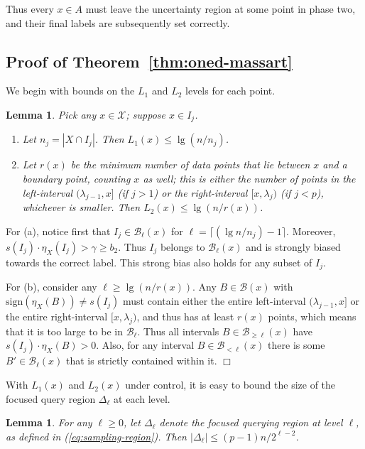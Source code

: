 \documentclass{article}
\def\X{{\mathcal X}}
\def\B{{\mathcal B}}
\newtheorem{lemma}[thm]{Lemma}
\newenvironment{proof}{\noindent {\sc Proof:}}{$\Box$ \medskip}
\begin{document}
Thus every $x \in A$ must leave the uncertainty region at some point in phase two, and their final labels are subsequently set correctly.

\subsection{Proof of Theorem~\ref{thm:oned-massart}}

We begin with bounds on the $L_1$ and $L_2$ levels for each point.
\begin{lemma}
Pick any $x \in \X$; suppose $x \in I_j$.
\begin{enumerate}
\item[(a)] Let $n_j = |X \cap I_j|$. Then $L_1(x) \leq \lg (n/n_j)$.
\item[(b)] Let $r(x)$ be the minimum number of data points that lie between $x$ and a boundary point, counting $x$ as well; this is either the number of points in the left-interval $(\lambda_{j-1},x]$ (if $j > 1$) or the right-interval $[x, \lambda_j)$ (if $j < p$), whichever is smaller. Then $L_2(x) \leq \lg (n/r(x))$.
\end{enumerate}
\label{lemma:oned-massart-L}
\end{lemma}
\begin{proof}
For (a), notice first that $I_j \in \B_{\ell}(x)$ for $\ell = \lceil (\lg n/n_j) - 1 \rceil$. Moreover, $s(I_j) \cdot \eta_X(I_j) > \gamma \geq b_2$. Thus $I_j$ belongs to $\B_\ell(x)$ and is strongly biased towards the correct label. This strong bias also holds for any subset of $I_j$. 

For (b), consider any $\ell \geq \lg (n/r(x))$. Any $B \in \B(x)$ with $\mbox{sign}(\eta_X(B)) \neq s(I_j)$ must contain either the entire left-interval $(\lambda_{j-1},x]$ or the entire right-interval $[x, \lambda_j)$, and thus has at least $r(x)$ points, which means that it is too large to be in $\B_\ell$. Thus all intervals $B \in \B_{\geq \ell}(x)$ have $s(I_j) \cdot \eta_X(B) > 0$. Also, for any interval $B \in \B_{<\ell}(x)$ there is some $B' \in \B_{\ell}(x)$ that is strictly contained within it.
\end{proof}

With $L_1(x)$ and $L_2(x)$ under control, it is easy to bound the size of the focused query region $\Delta_\ell$ at each level.
\begin{lemma}
For any $\ell \geq 0$, let $\Delta_\ell$ denote the focused querying region at level $\ell$, as defined in (\ref{eq:sampling-region}). Then $|\Delta_\ell| \leq (p-1)n/2^{\ell-2}$.
\label{lemma:oned-massart-query-region}
\end{lemma}
\end{document}
